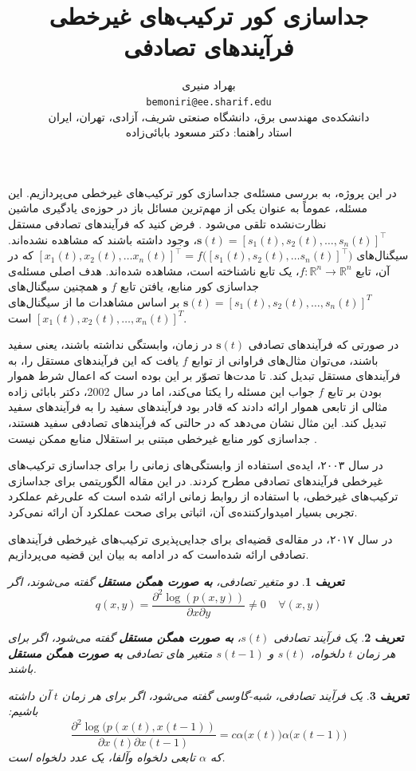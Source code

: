 \documentclass{article}
\title{جداسازی کور ترکیب‌های غیرخطی فرآیند‌های تصادفی}
\author{
	بهراد منیری\\
	\texttt{bemoniri@ee.sharif.edu}\\
	\normalsize{دانشکده‌ی مهندسی برق، دانشگاه صنعتی شریف، آزادی، تهران، ایران}
	\vspace{0.5cm}\\
	استاد راهنما:
	دکتر مسعود بابائی‌زاده
}
\date{}
\newtheorem{den}{{\large\bf تعریف}}[section]
\begin{document}
\maketitle
در این پروژه، به بررسی مسئله‌ی جداسازی کور ترکیب‌های غیر‌خطی می‌پردازیم. این مسئله،  عموماً به عنوان یکی از مهم‌ترین مسائل باز در حوزه‌ی یادگیری ماشین نظارت‌نشده تلقی می‌شود
\cite{hyvarinen2017nonlinear}.
فرض کنید که فرآیند‌های تصادفی‌ مستقل
$\textbf{s}(t) = [s_1(t), s_2(t), \dots, s_n(t)]^\top$،
 وجود داشته باشند که مشاهده نشده‌اند.  سیگنال‌های
$[x_1(t), x_2(t), \dots x_n(t)]^\top = f\Big([s_1(t), s_2(t), \dots s_n(t)]^\top\Big)$
که در آن، تابع 
$f: \mathbb{R}^n \to \mathbb{R}^n$،
یک تابع ناشناخته است، مشاهده شده‌اند. هدف اصلی مسئله‌ی جداسازی کور منابع، یافتن تابع $f$ و همچنین سیگنال‌های 
$\textbf{s}(t) = [s_1(t), s_2(t), \dots, s_n(t)]^T$
بر اساس مشاهدات ما از سیگنال‌های 
$[x_1(t), x_2(t), \dots, x_n(t)]^T$
است.

در صورتی که فرآیند‌های تصادفی
$\textbf{s}(t)$
در زمان، وابستگی نداشته باشند، یعنی سفید باشند، می‌توان مثال‌‌های فراوانی از توابع $f$ یافت که این فرآیند‌های مستقل را، به فرآیند‌های مستقل تبدیل کند. تا مدت‌ها تصوّر بر این بوده است که اعمال شرط هموار بودن بر تابع 
$f$
جواب این مسئله را یکتا می‌کند، اما در سال 2002، دکتر بابائی زاده مثالی از تابعی هموار ارائه‌ دادند که قادر بود فرآیند‌های سفید را به فرآیند‌های سفید تبدیل کند. این مثال نشان می‌دهد که در حالتی که فرآیند‌های تصادفی سفید هستند، جداسازی کور منابع غیرخطی مبتنی بر استقلال منابع ممکن نیست
\cite{mbzadehthesis}.

در سال ۲۰۰۳،
\cite{harmeling2003kernel}
ایده‌ی استفاده از وابستگی‌های زمانی را برای جداسازی ترکیب‌های غیرخطی فرآیند‌های تصادفی مطرح کردند. در این مقاله‌ الگوریتمی برای جداسازی ترکیب‌های غیرخطی، با استفاده از روابط زمانی ارائه شده است که علی‌رغم عملکرد تجربی بسیار امیدوارکننده‌ی آن، اثباتی برای صحت عملکرد آن ارائه نمی‌کرد.

در سال ۲۰۱۷، در مقاله‌ی
\cite{hyvarinen2017nonlinear}
قضیه‌ای برای جدایی‌پذیری ترکیب‌های غیرخطی فرآیند‌های تصادفی ارائه‌ شده‌است که در ادامه به بیان این قضیه می‌پردازیم.
\begin{den}
	دو متغیر تصادفی، 
	\textbf{	به صورت همگن مستقل}
	گفته می‌شوند، اگر
	$$q(x, y) = \frac{\partial^2 \log(p(x, y))}{\partial x \partial y}  \neq 0 \;\;\;\; \forall (x, y)$$
\end{den}
\begin{den}
	یک فرآیند تصادفی $s(t)$،
\textbf{	به صورت همگن مستقل}
		گفته می‌شود، اگر برای هر زمان $t$ دلخواه،
		$s(t)$
		و 
		$s(t-1)$
متغیر های تصادفی
	\textbf{	به صورت همگن مستقل}
	باشند.
\end{den}
\begin{den}
یک فرآیند‌ تصادفی، شبه-گاوسی گفته می‌شود، اگر برای هر زمان $t$ آن داشته باشیم:
$$\frac{\partial^2 \log(p(x(t), x(t-1))}{\partial x(t)\partial x(t-1)} = c\alpha\Big(x(t)\Big)\alpha\Big(x(t-1)\Big)$$
که $\alpha$  تابعی دلخواه  وآلفا، یک عدد دلخواه است.
\end{den}
\end{document}
